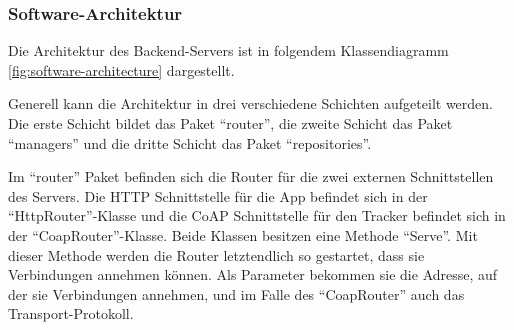 \subsubsection{Software-Architektur}
\FloatBarrier
Die Architektur des Backend-Servers ist in folgendem Klassendiagramm \ref{fig:software-architecture} dargestellt.

Generell kann die Architektur in drei verschiedene Schichten aufgeteilt werden.
Die erste Schicht bildet das Paket \enquote{router}, die zweite Schicht das Paket \enquote{managers} und die dritte Schicht das Paket \enquote{repositories}.

Im \enquote{router} Paket befinden sich die Router für die zwei externen Schnittstellen des Servers.
Die \gls{HTTP} Schnittstelle für die App befindet sich in der \enquote{HttpRouter}-Klasse und die \gls{CoAP} Schnittstelle für den Tracker befindet sich in der \enquote{CoapRouter}-Klasse.
Beide Klassen besitzen eine Methode \enquote{Serve}.
Mit dieser Methode werden die Router letztendlich so gestartet, dass sie Verbindungen annehmen können.
Als Parameter bekommen sie die Adresse, auf der sie Verbindungen annehmen, und im Falle des \enquote{CoapRouter} auch das Transport-Protokoll.

